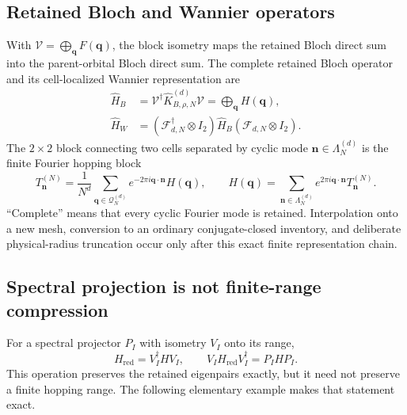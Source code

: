 \documentclass[11pt]{article}
\begin{document}
\subsection{Retained Bloch and Wannier operators}

With $\mathcal V=\bigoplus_{\mathbf q}F(\mathbf q)$, the block isometry maps the retained
Bloch direct sum into the parent-orbital Bloch direct sum. The complete retained Bloch
operator and its cell-localized Wannier representation are
\begin{align}
 \widehat H_B
 &=\mathcal V^\dagger\widehat K_{B,\rho,N}^{(d)}\mathcal V
 =\bigoplus_{\mathbf q}H(\mathbf q),\\
 \widehat H_W
 &=(\mathcal F_{d,N}^\dagger\otimes I_2)\widehat H_B
   (\mathcal F_{d,N}\otimes I_2).
 \label{eq:retained-wannier-operator}
\end{align}
The $2\times2$ block connecting two cells separated by cyclic mode
$\mathbf n\in\Lambda_N^{(d)}$ is the finite Fourier hopping block
\begin{equation}
 T_{\mathbf n}^{(N)}
 =\frac{1}{N^d}\sum_{\mathbf q\in\mathcal Q_N^{(d)}}
 e^{-2\pi i\mathbf q\cdot\mathbf n}H(\mathbf q),
 \qquad
 H(\mathbf q)=\sum_{\mathbf n\in\Lambda_N^{(d)}}
 e^{2\pi i\mathbf q\cdot\mathbf n}T_{\mathbf n}^{(N)}.
 \label{eq:finite-hopping-transform}
\end{equation}
``Complete'' means that every cyclic Fourier mode is retained. Interpolation onto a new
mesh, conversion to an ordinary conjugate-closed inventory, and deliberate
physical-radius truncation occur only after this exact finite representation chain.

\subsection{Spectral projection is not finite-range compression}

For a spectral projector $P_I$ with isometry $V_I$ onto its range,
\begin{equation}
 H_{\mathrm{red}}=V_I^\dagger H V_I,
 \qquad
 V_IH_{\mathrm{red}}V_I^\dagger=P_IHP_I.
 \label{eq:spectral-projection}
\end{equation}
This operation preserves the retained eigenpairs exactly, but it need not preserve a
finite hopping range. The following elementary example makes that statement exact.
\end{document}
